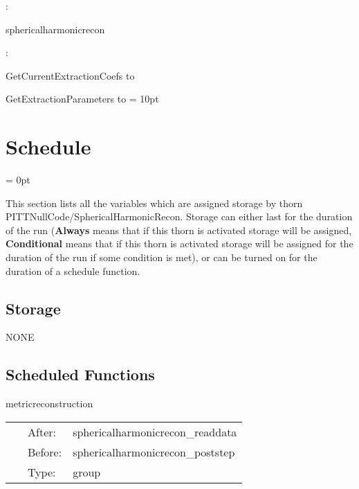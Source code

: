 : 

sphericalharmonicrecon
\vspace{2mm}

\vspace{5mm}

: 



GetCurrentExtractionCoefs to 

GetExtractionParameters to 
\vspace{2mm}\parskip = 10pt 

\section{Schedule} 


\parskip = 0pt


\noindent This section lists all the variables which are assigned storage by thorn PITTNullCode/SphericalHarmonicRecon.  Storage can either last for the duration of the run ({\bf Always} means that if this thorn is activated storage will be assigned, {\bf Conditional} means that if this thorn is activated storage will be assigned for the duration of the run if some condition is met), or can be turned on for the duration of a schedule function.


\subsection*{Storage}NONE
\subsection*{Scheduled Functions}
\vspace{5mm}


\hspace{5mm} metricreconstruction 

\hspace{5mm}{\it group for use by external thorns to use the metric } 


\hspace{5mm}

 \begin{tabular*}{160mm}{cll} 
~ & After:  & sphericalharmonicrecon\_readdata \\ 
~ & Before:  & sphericalharmonicrecon\_poststep \\ 
~ & Type:  & group \\ 
\end{tabular*} 


